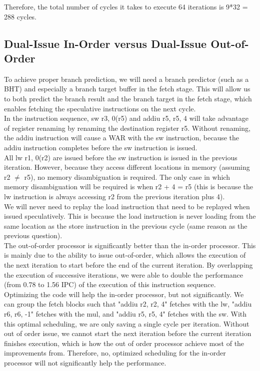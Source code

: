 \documentclass[10pt]{article}
\begin{document}
Therefore, the total number of cycles it takes to execute 64 iterations is 9*32 = 288 cycles.

\subsection{Dual-Issue In-Order versus Dual-Issue Out-of-Order}

To achieve proper branch prediction, we will need a branch predictor (such as a BHT) and especially a branch target buffer in the fetch stage. This will allow us to both predict the branch result and the branch target in the fetch stage, which enables fetching the speculative instructions on the next cycle. \\

In the instruction sequence, sw r3, 0(r5) and addiu r5, r5, 4 will take advantage of register renaming by renaming the destination register r5. Without renaming, the addiu instruction will cause a WAR with the sw instruction, because the addiu instruction completes before the sw instruction is issued. \\

All lw r1, 0(r2) are issued before the sw instruction is issued in the previous iteration. However, because they access different locations in memory (assuming r2 $\neq$ r5), no memory disambiguation is required. The only case in which memory disambiguation will be required is when r2 + 4 = r5 (this is because the lw instruction is always accessing r2 from the previous iteration plus 4).\\

We will never need to replay the load instruction that need to be replayed when issued speculatively. This is because the load instruction is never loading from the same location as the store instruction in the previous cycle (same reason as the previous question).\\

The out-of-order processor is significantly better than the in-order processor. This is mainly due to the ability to issue out-of-order, which allows the execution of the next iteration to start before the end of the current iteration. By overlapping the execution of successive iterations, we were able to double the performance (from 0.78 to 1.56 IPC) of the execution of this instruction sequence.\\

Optimizing the code will help the in-order processor, but not significantly. We can group the fetch blocks such that "addiu r2, r2, 4" fetches with the lw, "addiu r6, r6, -1" fetches with the mul, and "addiu r5, r5, 4" fetches with the sw. With this optimal scheduling, we are only saving a single cycle per iteration. Without out of order issue, we cannot start the next iteration before the current iteration finishes execution, which is how the out of order processor achieve most of the improvements from. Therefore, no, optimized scheduling for the in-order processor will not significantly help the performance. \\
\end{document}
